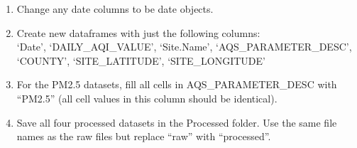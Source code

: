 \documentclass[
]{article}
\newenvironment{Shaded}{\begin{snugshade}}{\end{snugshade}}
\newcommand{\CommentTok}[1]{\textcolor[rgb]{0.56,0.35,0.01}{\textit{#1}}}
\newcommand{\FunctionTok}[1]{\textcolor[rgb]{0.13,0.29,0.53}{\textbf{#1}}}
\newcommand{\NormalTok}[1]{#1}
\newcommand{\OtherTok}[1]{\textcolor[rgb]{0.56,0.35,0.01}{#1}}
\newcommand{\SpecialCharTok}[1]{\textcolor[rgb]{0.81,0.36,0.00}{\textbf{#1}}}
\begin{document}
\begin{enumerate}
\def\labelenumi{\arabic{enumi}.}
\setcounter{enumi}{2}
\item
  Change any date columns to be date objects.
\item
  Create new dataframes with just the following columns:\\
  `Date', `DAILY\_AQI\_VALUE', `Site.Name', `AQS\_PARAMETER\_DESC',
  `COUNTY', `SITE\_LATITUDE', `SITE\_LONGITUDE'
\item
  For the PM2.5 datasets, fill all cells in AQS\_PARAMETER\_DESC with
  ``PM2.5'' (all cell values in this column should be identical).
\item
  Save all four processed datasets in the Processed folder. Use the same
  file names as the raw files but replace ``raw'' with ``processed''.
\end{enumerate}

\begin{Shaded}
\end{Shaded}

\begin{Shaded}
\end{Shaded}

\begin{Shaded}
\end{Shaded}

\begin{Shaded}
\end{Shaded}
\end{document}
